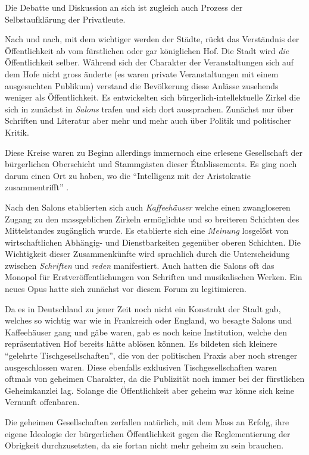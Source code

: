 \documentclass[a4paper,ngerman,11pt]{scrartcl}
\begin{document}
Die Debatte und Diskussion an sich ist zugleich auch Prozess der
Selbstaufklärung der Privatleute.

Nach und nach, mit dem wichtiger werden der Städte, rückt das Verständnis der
Öffentlichkeit ab vom fürstlichen oder gar königlichen Hof. Die Stadt wird
\emph{die} Öffentlichkeit selber. Während sich der Charakter der Veranstaltungen
sich auf dem Hofe nicht gross änderte (es waren private Veranstaltungen mit
einem ausgesuchten Publikum) verstand die Bevölkerung diese Anlässe zusehends
weniger als Öffentlichkeit. Es entwickelten sich bürgerlich-intellektuelle
Zirkel die sich in zunächst in \emph{Salons} trafen und sich dort
aussprachen. Zunächst nur über Schriften und Literatur aber mehr und mehr auch
über Politik und politischer Kritik.

Diese Kreise waren zu Beginn allerdings immernoch eine erlesene Gesellschaft
der bürgerlichen Oberschicht und Stammgästen dieser Établissements. Es ging
noch darum einen Ort zu haben, wo die ``Intelligenz mit der Aristokratie
zusammentrifft'' \cite{Habermas1962}.

Nach den Salons etablierten sich auch \emph{Kaffeehäuser} welche einen zwangloseren
Zugang zu den massgeblichen Zirkeln \cite{Habermas1962} ermöglichte und so
breiteren Schichten des Mittelstandes zugänglich wurde. Es etablierte sich
eine \emph{Meinung} losgelöst von wirtschaftlichen Abhängig- und Dienstbarkeiten
gegenüber oberen Schichten. Die Wichtigkeit dieser Zusammenkünfte wird
sprachlich durch die Unterscheidung zwischen \emph{Schriften} und \emph{reden}
manifestiert. Auch hatten die Salons oft das Monopol für
Erstveröffentlichungen von Schriften und musikalischen Werken. Ein neues Opus
hatte sich zunächst vor diesem Forum zu legitimieren.\cite{Habermas1962}

Da es in Deutschland zu jener Zeit noch nicht ein Konstrukt der Stadt gab,
welches so wichtig war wie in Frankreich oder England, wo besagte Salons und
Kaffeehäuser gang  und gäbe waren, gab es noch keine Institution, welche den
repräsentativen Hof bereits hätte ablösen können. Es bildeten sich kleinere
``gelehrte Tischgesellschaften'', die von der politischen Praxis aber noch
strenger ausgeschlossen waren. Diese ebenfalls exklusiven Tischgesellschaften
waren oftmals von geheimen Charakter, da die Publizität noch immer bei der
fürstlichen Geheimkanzlei lag.\cite{Habermas1962} Solange die Öffentlichkeit
aber geheim war könne sich keine Vernunft offenbaren.

Die geheimen Gesellschaften zerfallen natürlich, mit dem Mass an Erfolg, ihre
eigene Ideologie der bürgerlichen Öffentlichkeit gegen die Reglementierung der
Obrigkeit durchzusetzten, da sie fortan nicht mehr geheim zu sein
brauchen.
\end{document}
